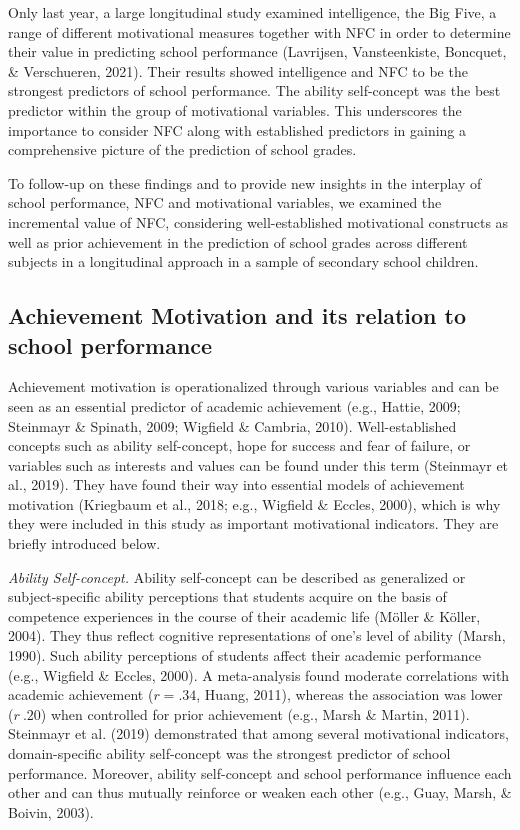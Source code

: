 \documentclass[
  man]{apa6}
\begin{document}
Only last year, a large longitudinal study examined intelligence, the Big Five, a range of different motivational measures together with NFC in order to determine their value in predicting school performance (Lavrijsen, Vansteenkiste, Boncquet, \& Verschueren, 2021). Their results showed intelligence and NFC to be the strongest predictors of school performance. The ability self-concept was the best predictor within the group of motivational variables. This underscores the importance to consider NFC along with established predictors in gaining a comprehensive picture of the prediction of school grades.

To follow-up on these findings and to provide new insights in the interplay of school performance, NFC and motivational variables, we examined the incremental value of NFC, considering well-established motivational constructs as well as prior achievement in the prediction of school grades across different subjects in a longitudinal approach in a sample of secondary school children.

\hypertarget{achievement-motivation-and-its-relation-to-school-performance}{%
\subsection{Achievement Motivation and its relation to school performance}\label{achievement-motivation-and-its-relation-to-school-performance}}

Achievement motivation is operationalized through various variables and can be seen as an essential predictor of academic achievement (e.g., Hattie, 2009; Steinmayr \& Spinath, 2009; Wigfield \& Cambria, 2010). Well-established concepts such as ability self-concept, hope for success and fear of failure, or variables such as interests and values can be found under this term (Steinmayr et al., 2019). They have found their way into essential models of achievement motivation (Kriegbaum et al., 2018; e.g., Wigfield \& Eccles, 2000), which is why they were included in this study as important motivational indicators. They are briefly introduced below.

\emph{Ability Self-concept.} Ability self-concept can be described as generalized or subject-specific ability perceptions that students acquire on the basis of competence experiences in the course of their academic life (Möller \& Köller, 2004). They thus reflect cognitive representations of one's level of ability (Marsh, 1990). Such ability perceptions of students affect their academic performance (e.g., Wigfield \& Eccles, 2000). A meta-analysis found moderate correlations with academic achievement (\(r=.34\), Huang, 2011), whereas the association was lower (\(r~.20\)) when controlled for prior achievement (e.g., Marsh \& Martin, 2011). Steinmayr et al. (2019) demonstrated that among several motivational indicators, domain-specific ability self-concept was the strongest predictor of school performance. Moreover, ability self-concept and school performance influence each other and can thus mutually reinforce or weaken each other (e.g., Guay, Marsh, \& Boivin, 2003).
\end{document}
